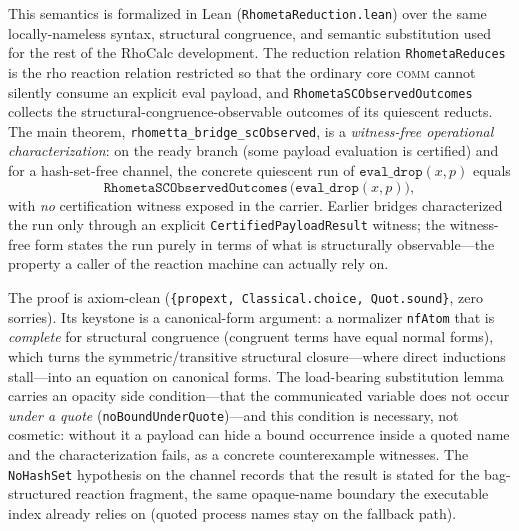 \documentclass[11pt]{article}
\newcommand{\code}[1]{\texttt{#1}}
\newcommand{\RhoCalc}{\textup{RhoCalc}}
\begin{document}
This semantics is formalized in Lean (\code{RhometaReduction.lean}) over the
same locally-nameless syntax, structural congruence, and semantic substitution
used for the rest of the \RhoCalc{} development.  The reduction relation
\code{RhometaReduces} is the rho reaction relation restricted so that the
ordinary core \textsc{comm} cannot silently consume an explicit eval payload,
and \code{RhometaSCObservedOutcomes} collects the
structural-congruence-observable outcomes of its quiescent reducts.  The main
theorem, \code{rhometta\_bridge\_scObserved}, is a \emph{witness-free
operational characterization}: on the ready branch (some payload evaluation is
certified) and for a hash-set-free channel, the concrete quiescent run of
$\texttt{eval\_drop}(x,p)$ equals
\[
  \texttt{RhometaSCObservedOutcomes}\,\big(\texttt{eval\_drop}(x,p)\big),
\]
with \emph{no} certification witness exposed in the carrier.  Earlier bridges
characterized the run only through an explicit \code{CertifiedPayloadResult}
witness; the witness-free form states the run purely in terms of what is
structurally observable---the property a caller of the reaction machine can
actually rely on.

The proof is axiom-clean (\code{\{propext, Classical.choice, Quot.sound\}}, zero
sorries).  Its keystone is a canonical-form argument: a normalizer
\code{nfAtom} that is \emph{complete} for structural congruence (congruent terms
have equal normal forms), which turns the symmetric/transitive structural
closure---where direct inductions stall---into an equation on canonical forms.
The load-bearing substitution lemma carries an opacity side condition---that the
communicated variable does not occur \emph{under a quote}
(\code{noBoundUnderQuote})---and this condition is necessary, not cosmetic:
without it a payload can hide a bound occurrence inside a quoted name and the
characterization fails, as a concrete counterexample witnesses.  The
\code{NoHashSet} hypothesis on the channel records that the result is stated for
the bag-structured reaction fragment, the same opaque-name boundary the
executable index already relies on (quoted process names stay on the fallback
path).
\end{document}
